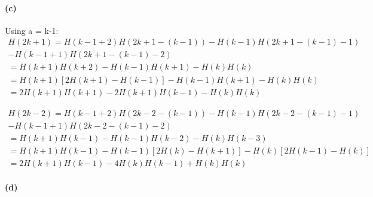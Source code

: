 \documentclass[11pt,a4paper]{article}
\begin{document}
\paragraph*{(c)}
Using a = k-1:
\begin{equation}
	\begin{aligned}
	H(2k+1) = H(k-1+2)H(2k+1-(k-1)) - H(k-1)H(2k+1-(k-1)-1) 
	\\- H(k-1+1)H(2k+1-(k-1)-2) 
	\\= H(k+1)H(k+2) - H(k-1)H(k+1) - H(k)H(k) 
	\\= H(k+1)[2H(k+1) - H(k-1)] - H(k-1)H(k+1) - H(k)H(k)
	\\= 2H(k+1)H(k+1) - 2H(k+1)H(k-1) - H(k)H(k)
 	\end{aligned}
\end{equation}

\begin{equation}
	\begin{aligned}
	H(2k-2) = H(k-1+2)H(2k-2-(k-1)) - H(k-1)H(2k-2-(k-1)-1) 
	\\- H(k-1+1)H(2k-2-(k-1)-2)
	\\= H(k+1)H(k-1) - H(k-1)H(k-2) - H(k)H(k-3)
	\\= H(k+1)H(k-1) -H(k-1)[2H(k) - H(k+1)] - H(k)[2H(k-1) - H(k)]
	\\=2H(k+1)H(k-1) - 4H(k)H(k-1) + H(k)H(k)
 	\end{aligned}
\end{equation}

\paragraph*{(d)}
\end{document}
